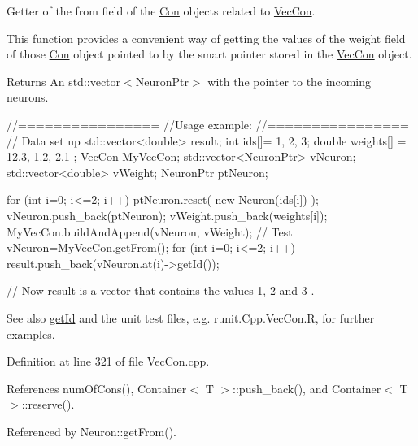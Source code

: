 Getter of the from field of the \hyperlink{class_con}{Con} objects related to \hyperlink{class_vec_con}{VecCon}. 

This function provides a convenient way of getting the values of the weight field of those \hyperlink{class_con}{Con} object pointed to by the smart pointer stored in the \hyperlink{class_vec_con}{VecCon} object.

\begin{DoxyReturn}{Returns}
An std::vector$<$NeuronPtr$>$ with the pointer to the incoming neurons.
\end{DoxyReturn}

\begin{DoxyCode}
        //================
        //Usage example:
        //================
        // Data set up
                std::vector<double> result;
                int ids[]= {1, 2, 3};
                double weights[] = {12.3, 1.2, 2.1 };
                VecCon MyVecCon;
                std::vector<NeuronPtr> vNeuron;
                std::vector<double> vWeight;
                NeuronPtr ptNeuron;

                        for (int i=0; i<=2; i++) {
                                ptNeuron.reset( new Neuron(ids[i]) );
                                vNeuron.push_back(ptNeuron);
                                vWeight.push_back(weights[i]);
                        }
                        MyVecCon.buildAndAppend(vNeuron, vWeight);
                // Test
                        vNeuron=MyVecCon.getFrom();
                        for (int i=0; i<=2; i++) {
                                result.push_back(vNeuron.at(i)->getId());
                        }

        // Now result is a vector that contains the values 1, 2 and 3 .
\end{DoxyCode}


\begin{DoxySeeAlso}{See also}
\hyperlink{class_vec_con_a03d5dde143e166e68b01c9596573eb5f}{getId} and the unit test files, e.g. runit.Cpp.VecCon.R, for further examples. 
\end{DoxySeeAlso}


Definition at line 321 of file VecCon.cpp.



References numOfCons(), Container$<$ T $>$::push\_\-back(), and Container$<$ T $>$::reserve().



Referenced by Neuron::getFrom().


